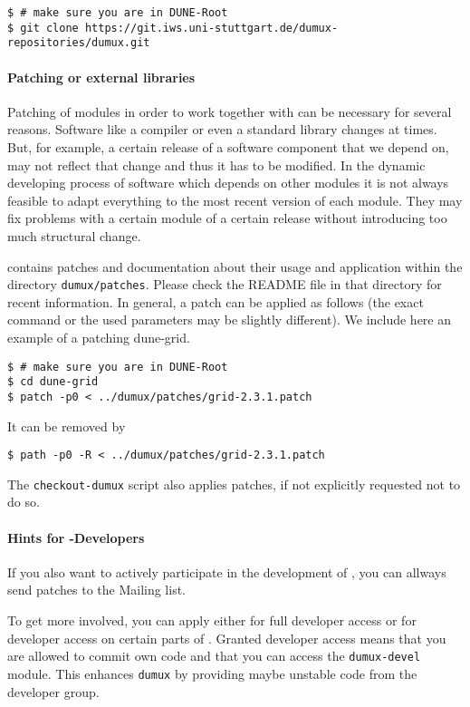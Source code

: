 \begin{lstlisting}[style=Bash]
$ # make sure you are in DUNE-Root
$ git clone https://git.iws.uni-stuttgart.de/dumux-repositories/dumux.git
\end{lstlisting}

\paragraph{Patching \Dune or external libraries}
\label{sc:patchingDUNE}
Patching of \Dune modules in order to work together with \Dumux can be necessary for several reasons.
Software like a compiler or even a standard library
changes at times. But, for example, a certain release of a software component that we depend on,
may not reflect that change and thus it has to be modified.
In the dynamic developing process of software which depends on other modules it is not always feasible
to adapt everything to the most recent version of each module. They may fix problems with a certain module
of a certain release without introducing too much structural change.

\Dumux contains patches and documentation about their usage and application within the
directory \texttt{dumux/patches}.
Please check the README file in that directory for recent information.
In general, a patch can be applied as follows
(the exact command or the used parameters may be slightly different).
We include here an example of a patching dune-grid.

\begin{lstlisting}[style=Bash]
$ # make sure you are in DUNE-Root
$ cd dune-grid
$ patch -p0 < ../dumux/patches/grid-2.3.1.patch
\end{lstlisting}

It can be removed by
\begin{lstlisting}[style=Bash]
$ path -p0 -R < ../dumux/patches/grid-2.3.1.patch
\end{lstlisting}

The \texttt{checkout-dumux} script also applies patches, if not explicitly requested not to do so.

\paragraph{Hints for \Dumux-Developers}
If you also want to actively participate in the development of \Dumux, you can allways send patches
to the Mailing list.

To get more involved, you can apply either for full developer
access or for developer access on certain parts of \Dumux. Granted developer access means that
you are allowed to commit own code and that you can access the \texttt{dumux-devel} module.
This enhances \texttt{dumux} by providing maybe unstable code from the developer group.


